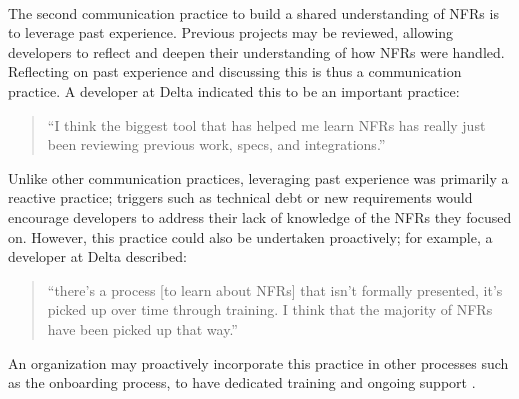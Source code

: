 \documentclass[smallextended]{svjour3}        %
\providecommand{\DIFaddtex}[1]{{\protect\color{blue}\uwave{#1}}} %
\providecommand{\DIFaddbegin}{} %
\providecommand{\DIFaddend}{} %
\providecommand{\DIFadd}[1]{\texorpdfstring{\DIFaddtex{#1}}{#1}} %
\newcommand{\DIFaddincludegraphics}[2][]{{\color{blue}\fbox{\DIFOincludegraphics[#1]{#2}}}} %
\DeclareRobustCommand{\DIFaddbegin}{\DIFOaddbegin \let\includegraphics\DIFaddincludegraphics} %
\DeclareRobustCommand{\DIFaddend}{\DIFOaddend \let\includegraphics\DIFOincludegraphics} %
\begin{document}
\DIFaddbegin \paragraph{\DIFadd{Leveraging Past Experience}} \DIFaddend The second communication practice to build a shared understanding of NFRs is to leverage past experience. 
Previous projects may be reviewed, allowing developers to reflect and deepen their understanding of how NFRs were handled. Reflecting on past experience and discussing this is thus a communication practice.
A developer at Delta indicated this to be an important practice:
\begin{quote}
    ``I think the biggest tool that has helped me learn NFRs has really just been reviewing previous work, specs, and integrations.''
\end{quote}    

Unlike other communication practices, leveraging past experience was primarily a \textmd{reactive} practice; triggers such as technical debt or new requirements would encourage developers to address their lack of knowledge of the NFRs they focused on. However, this practice could also be undertaken proactively; for example, a developer at Delta described:
\begin{quote}
    ``there's a process [to learn about NFRs] that isn't formally presented, it's picked up over time through training. I think that the majority of NFRs have been picked up that way.'' 
\end{quote}    
An organization may proactively incorporate this practice in other processes such as the onboarding process, to have dedicated training and ongoing support \citep{sharma2020onboarding}.
\end{document}
